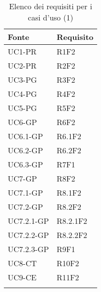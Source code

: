 

		\begin{table}[H]
			\centering
			{\def\arraystretch{1.5}
			\begin{tabularx}{\textwidth}{YY}
				\textbf{Fonte} & \textbf{Requisito} \\
				\toprule
				UC1-PR & R1F2 \\
				UC2-PR & R2F2 \\
				UC3-PG & R3F2 \\
				UC4-PG & R4F2 \\
				UC5-PG & R5F2 \\
				UC6-GP & R6F2 \\
				UC6.1-GP & R6.1F2 \\
				UC6.2-GP & R6.2F2 \\
				UC6.3-GP & R7F1 \\
				UC7-GP & R8F2 \\
				UC7.1-GP & R8.1F2 \\
				UC7.2-GP & R8.2F2 \\
				UC7.2.1-GP & R8.2.1F2 \\
				UC7.2.2-GP & R8.2.2F2 \\
				UC7.2.3-GP & R9F1 \\
				UC8-CT & R10F2 \\
				UC9-CE & R11F2 \\
				\bottomrule \\
			\end{tabularx}}
			\caption{Elenco dei requisiti per i casi d'uso (1)}
		\end{table}


